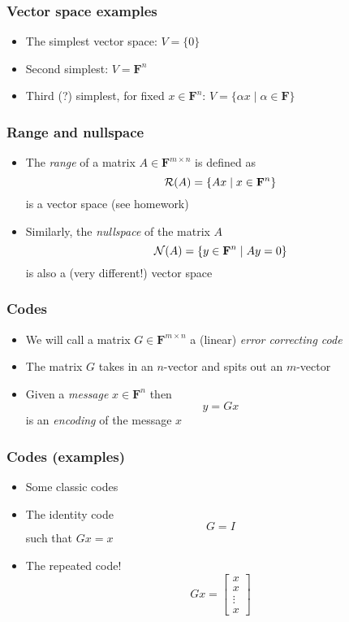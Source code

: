 \documentclass{beamer}
\newcommand{\field}{\mathbf{F}}
\begin{document}
    \begin{frame}
        \frametitle{Vector space examples}
        \begin{itemize}\itemsep=12pt
            \item The simplest vector space: $V = \{0\}$
            \pause
            \item Second simplest: $V = \field^n$
            \pause
            \item Third (?) simplest, for fixed $x \in \field^n$: $V = \{\alpha x \mid \alpha \in \field\}$
        \end{itemize}
    \end{frame}

    \begin{frame}
        \frametitle{Range and nullspace}
        \begin{itemize}\itemsep=12pt
            \item The \emph{range} of a matrix $A \in \field^{m\times n}$ is defined as
            \[
                \range(A) = \{Ax \mid x \in \field^n\}
            \]
            is a vector space (see homework)
            \pause
            \item Similarly, the \emph{nullspace} of the matrix $A$
            \[
                \nullspace(A) = \{y \in \field^n \mid Ay = 0\}
            \]
            is also a (very different!) vector space
        \end{itemize}
    \end{frame}

    
    \begin{frame}
        \frametitle{Codes}
        \begin{itemize}\itemsep=12pt
            \item We will call a matrix $G \in \field^{m \times n}$ a (linear) \emph{error correcting code}
            \item The matrix $G$ takes in an $n$-vector and spits out an $m$-vector
            \item Given a \emph{message} $x \in \field^n$ then
            \[
                y = Gx
            \]
            is an \emph{encoding} of the message $x$
        \end{itemize}
    \end{frame}

    \begin{frame}
        \frametitle{Codes (examples)}
        \begin{itemize}\itemsep=12pt
            \item Some classic codes
            \pause
            \item The identity code
            \[
                G = I
            \]
            such that $Gx = x$
            \pause
            \item The repeated code!
            \[
                Gx = \begin{bmatrix} x\\x\\\vdots\\x \end{bmatrix}
            \]
        \end{itemize}
    \end{frame}
\end{document}
